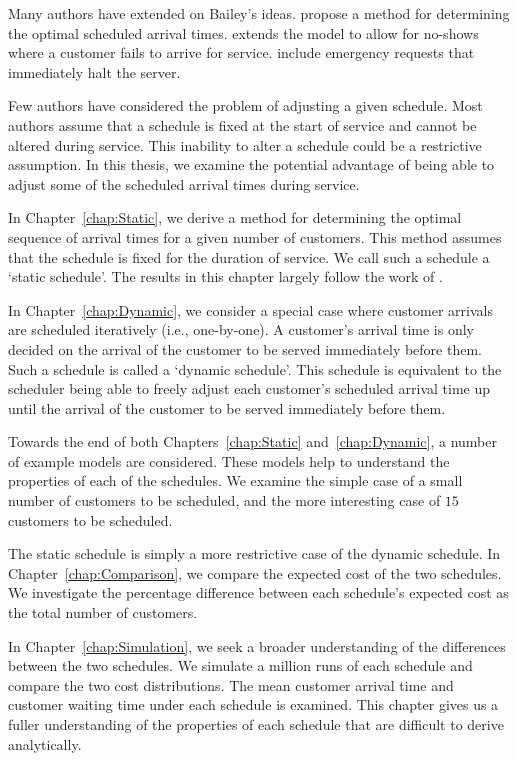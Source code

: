 Many authors have extended on Bailey's ideas. \citet{Pegden} propose a method for determining the optimal scheduled arrival times. \citet{Mendel} extends the model to allow for no-shows where a customer fails to arrive for service. \citet{Fiems} include emergency requests that immediately halt the server.

Few authors have considered the problem of adjusting a given schedule. Most authors assume that a schedule is fixed at the start of service and cannot be altered during service. This inability to alter a schedule could be a restrictive assumption. In this thesis, we examine the potential advantage of being able to adjust some of the scheduled arrival times during service.

In Chapter~\ref{chap:Static}, we derive a method for determining the optimal sequence of arrival times for a given number of customers. This method assumes that the schedule is fixed for the duration of service. We call such a schedule a `static schedule'. The results in this chapter largely follow the work of \citet{Pegden}.

In Chapter~\ref{chap:Dynamic}, we consider a special case where customer arrivals are scheduled iteratively (i.e., one-by-one). A customer's arrival time is only decided on the arrival of the customer to be served immediately before them. Such a schedule is called a `dynamic schedule'. This schedule is equivalent to the scheduler being able to freely adjust each customer's scheduled arrival time up until the arrival of the customer to be served immediately before them.

Towards the end of both Chapters~\ref{chap:Static} and~\ref{chap:Dynamic}, a number of example models are considered. These models help to understand the properties of each of the schedules. We examine the simple case of a small number of customers to be scheduled, and the more interesting case of $15$ customers to be scheduled.

The static schedule is simply a more restrictive case of the dynamic schedule. In Chapter~\ref{chap:Comparison}, we compare the expected cost of the two schedules. We investigate the percentage difference between each schedule's expected cost as the total number of customers.

In Chapter~\ref{chap:Simulation}, we seek a broader understanding of the differences between the two schedules. We simulate a million runs of each schedule and compare the two cost distributions. The mean customer arrival time and customer waiting time under each schedule is examined. This chapter gives us a fuller understanding of the properties of each schedule that are difficult to derive analytically.